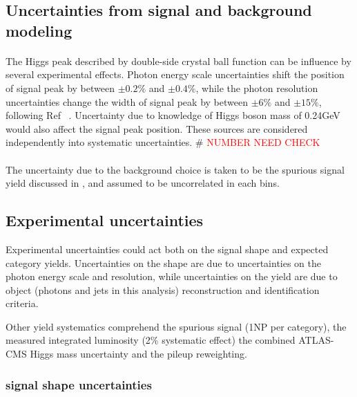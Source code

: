 \subsection{Uncertainties from signal and background modeling}
\label{ssec:modeluncert}

\paragraph{} The Higgs peak described by double-side crystal ball function can be influence by several experimental effects. 
Photon energy scale uncertainties shift the position of signal peak by between $\pm0.2\%$ and $\pm0.4\%$, while the photon resolution uncertainties change the width of signal peak by between $\pm 6\%$ and $\pm 15\%$, following Ref ~\cite{ref:phscaleres}. 
Uncertainty due to knowledge of Higgs boson mass of 0.24GeV ~\cite{ref:mHerror} would also affect the signal peak position. 
These sources are considered independently into systematic uncertainties. 
\# \textcolor{red}{NUMBER NEED CHECK}
\paragraph{} The uncertainty due to the background choice is taken to be the spurious signal yield discussed in \Sect{\ref{ssec:spurious_signal}}, and assumed to be uncorrelated in each bins. 


\subsection{Experimental uncertainties}
\label{ssec:expuncert}

Experimental uncertainties could act both on the signal shape and expected category yields. Uncertainties on the shape are due to uncertainties on the photon energy scale and resolution, while uncertainties on the yield are due to object (photons and jets in this analysis) reconstruction and identification criteria.

Other yield systematics comprehend the spurious signal (1NP per category), the measured integrated luminosity (2\% systematic effect) the combined ATLAS-CMS Higgs mass uncertainty and the pileup
reweighting.

\subsubsection{signal shape uncertainties}
\label{sssec:shapeuncer}


